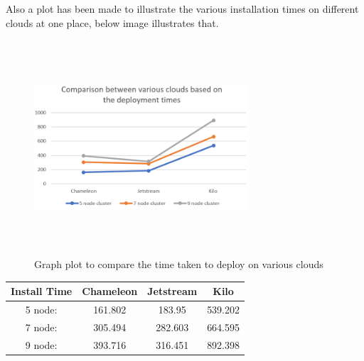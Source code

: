 \documentclass[9pt,twocolumn,twoside]{../../styles/osajnl}
\begin{document}
Also a plot has been made to illustrate the various installation times on different clouds at one place, below image illustrates that.


\begin{figure}[!htb]
  \includegraphics[width=8cm,height=8cm,keepaspectratio,width=\linewidth]{images/bar-4.png}
  \caption{Graph plot to compare the time taken to deploy on various clouds}
  \label{Graph plot to compare the time taken to deploy on various clouds}
\end{figure}



\begin{center}
 \begin{tabular}{|c|| c c c|} 
 \hline
 Install Time & Chameleon  & Jetstream & Kilo \\ [0.5ex]
 \hline\hline
 5 node: & 161.802 & 183.95 & 539.202\\
 \hline
 7 node: & 305.494 & 282.603 & 664.595 \\
 \hline
 9 node: & 393.716 & 316.451 & 892.398 \\
 \hline
\end{tabular}
\end{center}
\end{document}
